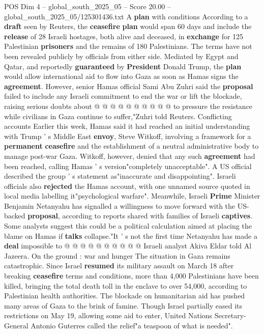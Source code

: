 \begin{textsample}{POS Dim 4 – global\_south\_2025\_05 – Score 20.00 – global\_south\_2025\_05/125301436.txt}
A \textbf{plan} with conditions According to a \textbf{draft} seen by Reuters, the \textbf{ceasefire} \textbf{plan} would span 60 days and include the \textbf{release} of 28 Israeli hostages, both alive and deceased, in \textbf{exchange} for 125 Palestinian \textbf{prisoners} and the remains of 180 Palestinians.
The terms have not been revealed publicly by officials from either side.
Mediated by Egypt and Qatar, and reportedly \textbf{guaranteed} by \textbf{President} Donald Trump, the \textbf{plan} would allow international aid to flow into Gaza as soon as Hamas signs the \textbf{agreement}.
However, senior Hamas official Sami Abu Zuhri said the \textbf{proposal} failed to include any Israeli commitment to end the war or lift the blockade, raising serious doubts about @ @ @ @ @ @ @ @ @ @ to pressure the resistance while civilians in Gaza continue to suffer,"Zuhri told Reuters.
Conflicting accounts Earlier this week, Hamas said it had reached an initial understanding with Trump ' s Middle East \textbf{envoy}, Steve Witkoff, involving a framework for a \textbf{permanent} \textbf{ceasefire} and the establishment of a neutral administrative body to manage post-war Gaza.
Witkoff, however, denied that any such \textbf{agreement} had been reached, calling Hamas ' s version"completely unacceptable".
A US official described the group ' s statement as"inaccurate and disappointing".
Israeli officials also \textbf{rejected} the Hamas account, with one unnamed source quoted in local media labelling it"psychological warfare".
Meanwhile, Israeli \textbf{Prime} Minister Benjamin Netanyahu has signalled a willingness to move forward with the US-backed \textbf{proposal}, according to reports shared with families of Israeli \textbf{captives}.
Some analysts suggest this could be a political calculation aimed at placing the blame on Hamas if \textbf{talks} collapse."It ' s not the first time Netanyahu has made a \textbf{deal} impossible to @ @ @ @ @ @ @ @ @ @ Israeli analyst Akiva Eldar told Al Jazeera.
On the ground : war and hunger The situation in Gaza remains catastrophic.
Since Israel \textbf{resumed} its military assault on March 18 after breaking \textbf{ceasefire} terms and conditions, more than 4,000 Palestinians have been killed, bringing the total death toll in the enclave to over 54,000, according to Palestinian health authorities.
The blockade on humanitarian aid has pushed many areas of Gaza to the brink of famine.
Though Israel partially eased its restrictions on May 19, allowing some aid to enter, United Nations Secretary-General Antonio Guterres called the relief"a teaspoon of what is needed".

\end{textsample}
